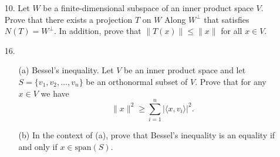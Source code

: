 \begin{enumerate}
    \item[10.] Let \(W\) be a finite-dimensional subspace of an inner product space \(V\). Prove that there exists a projection \(T\) on \(W\) Along \(W^{\perp}\) that satisfies \(N(T)=W^{\perp}\).
    In addition, prove that \(\lVert T(x) \rVert \leq \lVert x \rVert\) for all \(x \in V\). \vspace{3cm}
    \item[16.] \begin{enumerate}
        \item [(a)] Bessel's inequality. Let \(V\) be an inner product space and let \(S = \{v_1, v_2, \dots , v_n\}\) be an orthonormal subset of \(V\). Prove that for any \(x \in V\) we have
        \[ \lVert x \rVert^2 \geq \sum_{i=1}^{n} |\langle x,v_i\rangle|^2. \] \vspace{3cm}
        \item[(b)] In the context of (a), prove that Bessel's inequality is an equality if and only if \(x \in \text{span}(S)\).
    \end{enumerate}
\end{enumerate}
\vspace{3cm}
